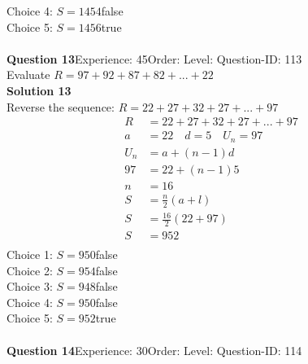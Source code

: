 \documentclass{article}
\begin{document}
Choice 4: \hspace{20pt}$S=1454$\hspace{20pt}false\\
Choice 5: \hspace{20pt}$S=1456$\hspace{20pt}true\\
\\[4pt]
\noindent\textbf{Question 13}\hspace{20pt}Experience: 45\hspace{20pt}Order: \hspace{20pt}Level: \hspace{20pt}Question-ID: 113\\[2pt]
Evaluate $R=97+92+87+82+...+22$\\[4pt]
\noindent\textbf{Solution 13}\\[2pt]
Reverse the sequence: $R=22+27+32+27+...+97$
\begin{align*}
R&=22+27+32+27+...+97\\[2pt]
a&=22\quad d=5 \quad U_n=97\\[2pt]
U_n&=a+(n-1)d\\[2pt]
97&=22+(n-1)5\\[2pt]
n&=16\\[12pt]
S&=\displaystyle\frac{n}{2}(a+l)\\[2pt]
S&=\displaystyle\frac{16}{2}(22+97)\\[2pt]
S&=952\\
\end{align*}
Choice 1: \hspace{20pt}$S=950$\hspace{20pt}false\\
Choice 2: \hspace{20pt}$S=954$\hspace{20pt}false\\
Choice 3: \hspace{20pt}$S=948$\hspace{20pt}false\\
Choice 4: \hspace{20pt}$S=950$\hspace{20pt}false\\
Choice 5: \hspace{20pt}$S=952$\hspace{20pt}true\\
\\[4pt]
\noindent\textbf{Question 14}\hspace{20pt}Experience: 30\hspace{20pt}Order: \hspace{20pt}Level: \hspace{20pt}Question-ID: 114\\[2pt]
\end{document}
